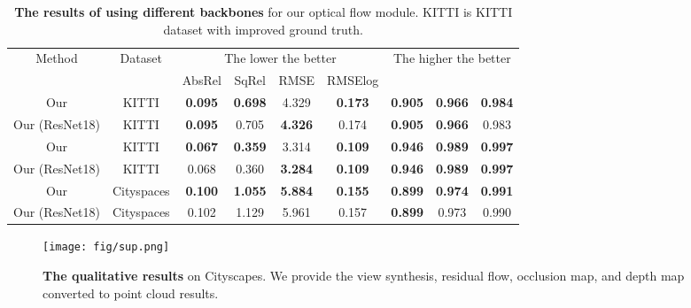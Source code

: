 \documentclass[journal]{IEEEtran}
\begin{document}
\begin{table*}
\centering
\caption{\textbf{The results of using different backbones} for our optical flow module. KITTI is KITTI dataset with improved ground truth.}
\label{tab:8}
\begin{tabular}{ccccccccc}
\toprule[1pt]
\multirow{2}{*}{Method} & \multirow{2}{*}{Dataset} & \multicolumn{4}{c}{The lower the better} & \multicolumn{3}{c}{The higher the better}              \\ \cline{3-9} 
                        &                          & AbsRel   & SqRel   & RMSE    & RMSElog   &  &  &  \\ \hline
Our                     & KITTI                    & \textbf{0.095}    & \textbf{0.698}   & 4.329   & \textbf{0.173}     & \textbf{0.905}           & \textbf{0.966}             & \textbf{0.984}             \\
Our (ResNet18)          & KITTI                    & \textbf{0.095}    & 0.705   & \textbf{4.326}   & 0.174     & \textbf{0.905}           & \textbf{0.966}             & 0.983             \\ \hline
Our                     & KITTI                   & \textbf{0.067}    & \textbf{0.359}   & 3.314   & \textbf{0.109}     & \textbf{0.946}           & \textbf{0.989}             & \textbf{0.997}             \\
Our (ResNet18)          & KITTI                   & 0.068    & 0.360   & \textbf{3.284}   & \textbf{0.109}     & \textbf{0.946}           & \textbf{0.989}             & \textbf{0.997}             \\ \hline
Our                     & Cityspaces               & \textbf{0.100}    & \textbf{1.055}   & \textbf{5.884}   & \textbf{0.155}     & \textbf{0.899}           & \textbf{0.974}             & \textbf{0.991}             \\
Our (ResNet18)          & Cityspaces               & 0.102    & 1.129   & 5.961   & 0.157     & \textbf{0.899}           & 0.973             & 0.990             \\ \bottomrule[1pt]
\end{tabular}
\end{table*}


\begin{figure}[!ht]
    \centering
    \texttt{[image: fig/sup.png]}
    \caption{\textbf{The qualitative results} on Cityscapes. We provide the view synthesis, residual flow, occlusion map, and depth map converted to point cloud results.}
    \label{fig:12}
\end{figure}
\end{document}
